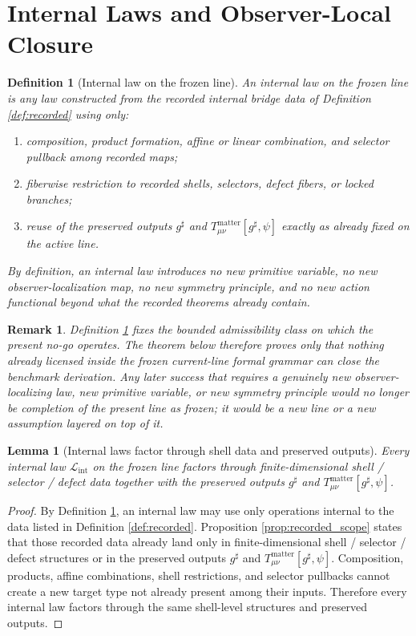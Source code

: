 \documentclass[11pt]{article}
\newcommand{\FixedMetric}{g^{\sharp}}
\newcommand{\InternalLaw}{\mathcal L_{\mathrm{int}}}
\newtheorem{definition}{Definition}
\newtheorem{lemma}{Lemma}
\newtheorem{remark}{Remark}
\begin{document}
\section{Internal Laws and Observer-Local Closure}

\begin{definition}[Internal law on the frozen line]
\label{def:internal}
An \emph{internal law} on the frozen line is any law constructed from the recorded internal bridge data of Definition \ref{def:recorded} using only:
\begin{enumerate}
    \item composition, product formation, affine or linear combination, and selector pullback among recorded maps;
    \item fiberwise restriction to recorded shells, selectors, defect fibers, or locked branches;
    \item reuse of the preserved outputs \(\FixedMetric\) and \(T_{\mu\nu}^{\mathrm{matter}}[\FixedMetric,\psi]\) exactly as already fixed on the active line.
\end{enumerate}
By definition, an internal law introduces no new primitive variable, no new observer-localization map, no new symmetry principle, and no new action functional beyond what the recorded theorems already contain.
\end{definition}

\begin{remark}
Definition \ref{def:internal} fixes the bounded admissibility class on which the present no-go operates. The theorem below therefore proves only that nothing already licensed inside the frozen current-line formal grammar can close the benchmark derivation. Any later success that requires a genuinely new observer-localizing law, new primitive variable, or new symmetry principle would no longer be completion of the present line as frozen; it would be a new line or a new assumption layered on top of it.
\end{remark}

\begin{lemma}[Internal laws factor through shell data and preserved outputs]
\label{lem:factor}
Every internal law \(\InternalLaw\) on the frozen line factors through finite-dimensional shell / selector / defect data together with the preserved outputs \(\FixedMetric\) and \(T_{\mu\nu}^{\mathrm{matter}}[\FixedMetric,\psi]\).
\end{lemma}

\begin{proof}
By Definition \ref{def:internal}, an internal law may use only operations internal to the data listed in Definition \ref{def:recorded}. Proposition \ref{prop:recorded_scope} states that those recorded data already land only in finite-dimensional shell / selector / defect structures or in the preserved outputs \(\FixedMetric\) and \(T_{\mu\nu}^{\mathrm{matter}}[\FixedMetric,\psi]\). Composition, products, affine combinations, shell restrictions, and selector pullbacks cannot create a new target type not already present among their inputs. Therefore every internal law factors through the same shell-level structures and preserved outputs.
\end{proof}
\end{document}
